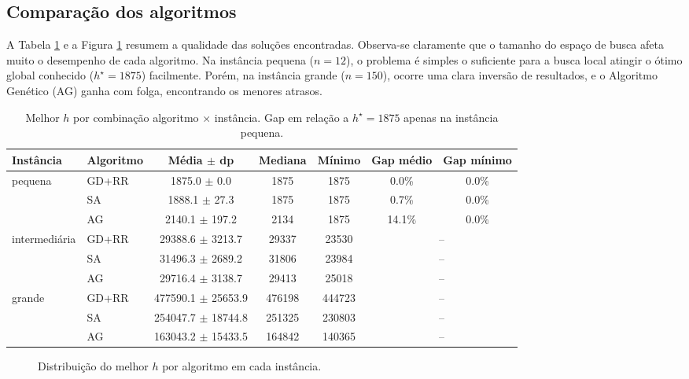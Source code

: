 \subsection{Comparação dos algoritmos}
\label{subsec:comparacao}

A Tabela \ref{tab:principal} e a Figura \ref{fig:boxplots} resumem a qualidade das soluções encontradas. Observa-se claramente que o tamanho do espaço de busca afeta muito o desempenho de cada algoritmo. Na instância pequena ($n=12$), o problema é simples o suficiente para a busca local atingir o ótimo global conhecido ($h^\star=1875$) facilmente. Porém, na instância grande ($n=150$), ocorre uma clara inversão de resultados, e o Algoritmo Genético (AG) ganha com folga, encontrando os menores atrasos.

\begin{table}[t]
\centering
\caption{Melhor $h$ por combinação algoritmo $\times$ instância. Gap em relação a $h^\star = 1875$ apenas na instância pequena.}
\label{tab:principal}
\begin{tabular}{llccccc}
\toprule
Instância     & Algoritmo & Média $\pm$ dp & Mediana & Mínimo & Gap médio & Gap mínimo \\
\midrule
pequena & GD+RR & 1875.0 $\pm$ 0.0 & 1875 & 1875 & 0.0\% & 0.0\% \\
 & SA & 1888.1 $\pm$ 27.3 & 1875 & 1875 & 0.7\% & 0.0\% \\
 & AG & 2140.1 $\pm$ 197.2 & 2134 & 1875 & 14.1\% & 0.0\% \\
\midrule
intermedi\'aria & GD+RR & 29388.6 $\pm$ 3213.7 & 29337 & 23530 & \multicolumn{2}{c}{--} \\
 & SA & 31496.3 $\pm$ 2689.2 & 31806 & 23984 & \multicolumn{2}{c}{--} \\
 & AG & 29716.4 $\pm$ 3138.7 & 29413 & 25018 & \multicolumn{2}{c}{--} \\
\midrule
grande & GD+RR & 477590.1 $\pm$ 25653.9 & 476198 & 444723 & \multicolumn{2}{c}{--} \\
 & SA & 254047.7 $\pm$ 18744.8 & 251325 & 230803 & \multicolumn{2}{c}{--} \\
 & AG & 163043.2 $\pm$ 15433.5 & 164842 & 140365 & \multicolumn{2}{c}{--} \\
\bottomrule
\end{tabular}
\end{table}

\begin{figure}[t]
\centering
{}
\caption{Distribuição do melhor $h$ por algoritmo em cada instância.}
\label{fig:boxplots}
\end{figure}


